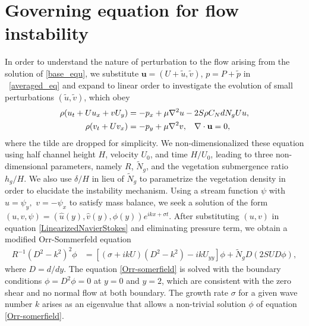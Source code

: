 \documentclass[12pt]{report}   %
\newcommand{\bu}{\mathbf{u}}
\newcommand{\hg}{h_g}
\newcommand{\Rey}{{R}}
\newcommand{\Ndg}{\tilde{N}_g}
\begin{document}
\section{Governing equation for flow instability}
 In order to understand the nature of perturbation to the flow arising from the solution of \ref{base_equ}, we substitute $\bu = (U+\tilde{u}, \tilde{v})$, $p=P+\tilde{p}$ in ~\eqref{averaged_eq} and expand to linear order to investigate the evolution of small perturbations $(\tilde{u}, \tilde{v})$, which obey
\begin{equation}
\begin{split}
\rho(u_t+U u_x+vU_y) &= -p_x+ {\mu}\nabla^2u-2S\rho C_{N}dN_{g}Uu, \\
\rho(v_t+ Uv_x) &= -p_y+ {\mu}\nabla^2v, \hspace{0.3cm} \nabla\cdot\bu=0,
\label{LinearizedNavierStokes}
\end{split} 
\end{equation}
where the tilde are dropped for simplicity.
We non-dimensionalized these equation using half channel height $H$, velocity $U_0$, and time $H/U_0$, leading to three non-dimensional parameters, namely $\Rey$, $\Ndg$, and the vegetation submergence ratio $\hg/H$. 
We also use $\delta/H$ in lieu of $\Ndg$ to parametrize the vegetation density in order to elucidate the instability mechanism. 
Using a stream function $\psi$ with $u = \psi_{y},$  $v= -\psi_x$ to satisfy mass balance, we seek a solution of 
the form $\left(u,v,\psi \right)= \left(\hat u(y), \hat v(y), \phi(y) \right)e^{ikx+\sigma t}$. After substituting $(u,v)$ in equation \eqref{LinearizedNavierStokes} and eliminating pressure term, we obtain a modified Orr-Sommerfeld equation \cite{Drazin81,Chen97,Chu91} 
\begin{equation}
\begin{split}
\Rey^{-1}\left(D^2 -k^{2} \right)^2\phi &= \left[ \left({\sigma}+ikU\right) \left(D^2-k^2\right) -ikU_{yy}\right]\phi + \Ndg D\left(2 S U D \phi\right),
\label{Orr-somerfield}
\end{split}
\end{equation}
where $D=d/dy$. The equation \eqref{Orr-somerfield} is solved with the boundary conditions $\phi = D^2\phi = 0$ at $y=0$ and $y=2$, which are consistent with the zero shear and no normal flow at both boundary. 
The growth rate $\sigma$ for a given wave number $k$ arises as an eigenvalue that allows a non-trivial solution $\phi$ of equation \eqref{Orr-somerfield}.
\end{document}
